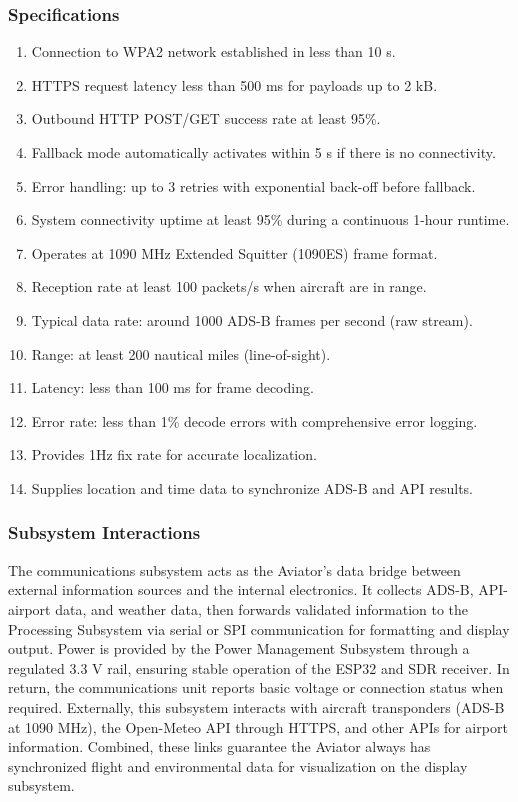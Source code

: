 \subsubsection{Specifications}
\begin{enumerate}
    \item Connection to WPA2 network established in less than 10 s.
    \item HTTPS request latency less than 500 ms for payloads up to 2 kB.
    \item Outbound HTTP POST/GET success rate at least 95\%.
    \item Fallback mode automatically activates within 5 s if there is no connectivity.
    \item Error handling: up to 3 retries with exponential back-off before fallback.
    \item System connectivity uptime at least 95\% during a continuous 1-hour runtime.
    \item Operates at 1090 MHz Extended Squitter (1090ES) frame format.
    \item Reception rate at least 100 packets/s when aircraft are in range.
    \item Typical data rate: around 1000 ADS-B frames per second (raw stream).
    \item Range: at least 200 nautical miles (line-of-sight).
    \item Latency: less than 100 ms for frame decoding.
    \item Error rate: less than 1\% decode errors with comprehensive error logging.
    \item Provides 1Hz fix rate for accurate localization.
    \item Supplies location and time data to synchronize ADS-B and API results.
\end{enumerate}

\subsubsection{Subsystem Interactions}
The communications subsystem acts as the Aviator’s data bridge between external information sources and the internal electronics. 
It collects ADS-B, API-airport data, and weather data, then forwards validated information to the Processing Subsystem via serial or SPI communication for formatting and display output.
\newline
Power is provided by the Power Management Subsystem through a regulated 3.3 V rail, ensuring stable operation of the ESP32 and SDR receiver. In return, the communications unit reports basic voltage or connection status when required.
\newline
Externally, this subsystem interacts with aircraft transponders (ADS-B at 1090 MHz), the Open-Meteo API through HTTPS, and other APIs for airport information. 
Combined, these links guarantee the Aviator always has synchronized flight and environmental data for visualization on the display subsystem.


